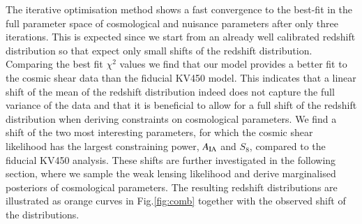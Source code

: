 \documentclass{aa}
\begin{document}
The iterative optimisation method shows a fast convergence to the best-fit in the full parameter space of cosmological and nuisance parameters after only three iterations. This is expected since we start from an already well calibrated redshift distribution so that expect only small shifts of the redshift distribution. Comparing the best fit $\chi^2$ values we find that our model provides a better fit to the cosmic shear data than the fiducial KV450 model. This indicates that a linear shift of the mean of the redshift distribution indeed does not capture the full variance of the data and that it is beneficial to allow for a full shift of the redshift distribution when deriving constraints on cosmological parameters. We find a shift of the two most interesting parameters, for which the cosmic shear likelihood has the largest constraining power, $A_{\rm IA}$ and $S_8$, compared to the fiducial KV450 analysis. These shifts are further investigated in the following section, where we sample the weak lensing likelihood and derive marginalised posteriors of cosmological parameters. The resulting redshift distributions are illustrated as orange curves in Fig.\ref{fig:comb} together with the observed shift of the distributions.
\end{document}
